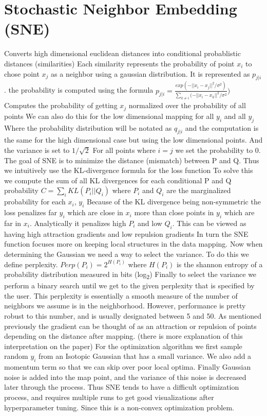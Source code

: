 \documentclass[11pt]{article}
\begin{document}
\section{Stochastic Neighbor Embedding (SNE)}
\label{sec:org7320e51}
Converts high dimensional euclidean distances into conditional probablistic distances (similarities)
Each similarity represents the probability of point \(x_i\) to chose point \(x_j\) as a neighbor using a gaussian distribution. It is represented as \(p_{j|i}\).
the probability is computed using the formula \(p_{j|i} = \frac{exp(-||x_i-x_j||^2/\sigma^2)}{\sum_{k \neq i}(-||x_i - x_k||^2/\sigma^2})\)
Computes the probability of getting \(x_j\) normalized over the probability of all points
We can also do this for the low dimensional mapping for all \(y_i\) and all \(y_j\)
Where the probability distribution will be notated as \(q_{j|i}\) and the computation is the same for the high dimensional case but using the low dimensional points. And the variance is set to \(1/\sqrt2\)
For all points where \(i=j\) we set the probability to 0.
The goal of SNE is to minimize the distance (mismatch) between P and Q. Thus we intuitively use the KL-divergence formula for the loss function
To solve this we compute the sum of all KL divergences for each conditional P and Q probability
\(C = \sum_iKL(P_i||Q_i)\) where \(P_i\) and \(Q_i\) are the marginalized probability for each \(x_i\), \(y_i\)
Because of the KL divergence being non-symmetric the loss penalizes far \(y_i\) which are close in \(x_i\) more than close points in \(y_i\) which are far in \(x_i\).
Analytically it penalizes high \(P_i\) and low \(Q_i\).
This can be viewed as having high attraction gradients and low repulsion gradients
In turn the SNE function focuses more on keeping local structures in the data mapping.
Now when determining the Gaussian we need a way to select the variance. To do this we define perplexity.
\(Perp(P_i) = 2^{H(P_i)}\)
where \(H(P_i)\) is the shannon entropy of a probability distribution measured in bits (log\textsubscript{2})
Finally to select the variance we perform a binary search until we get to the given perplexity that is specified by the user.
This perplexity is essentially a smooth measure of the number of neighbors we assume is in the neighborhood. However, performance is pretty robust to this number, and is usually designated between 5 and 50.
As mentioned previously the gradient can be thought of as an attraction or repulsion of points depending on the distance after mapping. (there is more explanation of this interpretation on the paper)
For the optimization algorithm we first sample random \(y_i\) from an Isotopic Gaussian that has a small variance.
We also add a momentum term so that we can skip over poor local optima.
Finally Gaussian noise is added into the map point, and the variance of this noise is decreased later through the process.
Thus SNE tends to have a difficult optimization process, and requires multiple runs to get good visualizations after hyperparameter tuning. Since this is a non-convex optimization problem.
\end{document}
